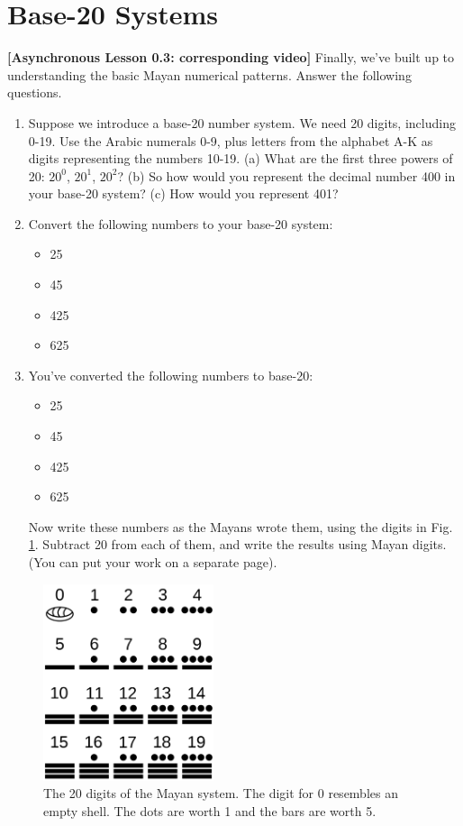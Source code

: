\documentclass[10pt]{article}
\begin{document}
\section{Base-20 Systems}

\textbf{[Asynchronous Lesson 0.3: corresponding video]}  Finally, we've built up to understanding the basic Mayan numerical patterns.  Answer the following questions.

\begin{enumerate}
\item Suppose we introduce a base-20 number system.  We need 20 digits, including 0-19.  Use the Arabic numerals 0-9, plus letters from the alphabet A-K as digits representing the numbers 10-19.  (a) What are the first three powers of 20: $20^0$, $20^1$, $20^2$? (b) So how would you represent the decimal number 400 in your base-20 system? (c) How would you represent 401? \\ \vspace{2cm}
\item Convert the following numbers to your base-20 system:
\begin{itemize}
\item 25
\item 45
\item 425
\item 625
\end{itemize}
\item You've converted the following numbers to base-20:
\begin{itemize}
\item 25
\item 45
\item 425
\item 625
\end{itemize}
Now write these numbers as the Mayans wrote them, using the digits in Fig. \ref{fig:maya}.  Subtract 20 from each of them, and write the results using Mayan digits.  (You can put your work on a separate page).
\end{enumerate}

\begin{figure}[hb]
\centering
\includegraphics[width=5cm]{figures/maya_digits.png}
\caption{\label{fig:maya} The 20 digits of the Mayan system.  The digit for 0 resembles an empty shell.  The dots are worth 1 and the bars are worth 5.}
\end{figure}
\end{document}

